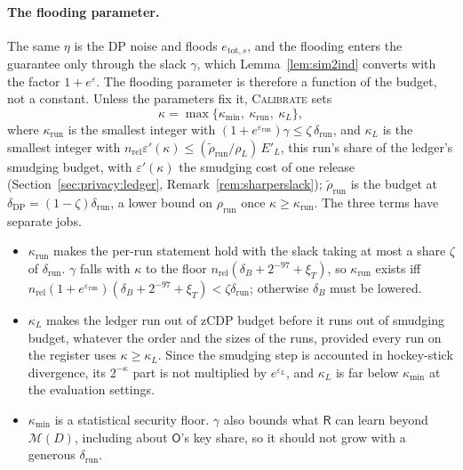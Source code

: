 \documentclass[11pt]{article}
\theoremstyle{definition}
\theoremstyle{plain}
\newcommand{\Party}[1]{\textsf{#1}}
\newcommand{\Rp}{\Party{R}}
\newcommand{\Op}{\Party{O}}
\begin{document}
\paragraph{The flooding parameter.} The same $\eta$ is the DP noise and floods $e_{\mathrm{tot},s}$, and the flooding enters the guarantee only through the slack $\gamma$, which Lemma~\ref{lem:sim2ind} converts with the factor $1 + e^{\varepsilon}$. The flooding parameter is therefore a function of the budget, not a constant. Unless the parameters fix it, \textsc{Calibrate} sets
\begin{equation}
  \kappa = \max\{\kappa_{\min},\ \kappa_{\mathrm{run}},\ \kappa_L\},
  \label{eq:kappa}
\end{equation}
where $\kappa_{\mathrm{run}}$ is the smallest integer with $(1 + e^{\varepsilon_{\mathrm{run}}})\gamma \le \zeta\,\delta_{\mathrm{run}}$, and $\kappa_L$ is the smallest integer with $n_{\mathrm{rel}}\varepsilon'(\kappa) \le (\tilde\rho_{\mathrm{run}}/\rho_L)\,E'_L$, this run's share of the ledger's smudging budget, with $\varepsilon'(\kappa)$ the smudging cost of one release (Section~\ref{sec:privacy:ledger}, Remark~\ref{rem:sharperslack}); $\tilde\rho_{\mathrm{run}}$ is the budget at $\delta_{\mathrm{DP}} = (1 - \zeta)\delta_{\mathrm{run}}$, a lower bound on $\rho_{\mathrm{run}}$ once $\kappa \ge \kappa_{\mathrm{run}}$. The three terms have separate jobs.
\begin{itemize}[noitemsep]
  \item $\kappa_{\mathrm{run}}$ makes the per-run statement hold with the slack taking at most a share $\zeta$ of $\delta_{\mathrm{run}}$. $\gamma$ falls with $\kappa$ to the floor $n_{\mathrm{rel}}(\delta_B + 2^{-97} + \xi_T)$, so $\kappa_{\mathrm{run}}$ exists iff $n_{\mathrm{rel}}(1 + e^{\varepsilon_{\mathrm{run}}})(\delta_B + 2^{-97} + \xi_T) < \zeta\delta_{\mathrm{run}}$; otherwise $\delta_B$ must be lowered.
  \item $\kappa_L$ makes the ledger run out of zCDP budget before it runs out of smudging budget, whatever the order and the sizes of the runs, provided every run on the register uses $\kappa \ge \kappa_L$. Since the smudging step is accounted in hockey-stick divergence, its $2^{-\kappa}$ part is not multiplied by $e^{\varepsilon_L}$, and $\kappa_L$ is far below $\kappa_{\min}$ at the evaluation settings.
  \item $\kappa_{\min}$ is a statistical security floor. $\gamma$ also bounds what $\Rp$ can learn beyond $\mathcal M(D)$, including about $\Op$'s key share, so it should not grow with a generous $\delta_{\mathrm{run}}$.
\end{itemize}
\end{document}
